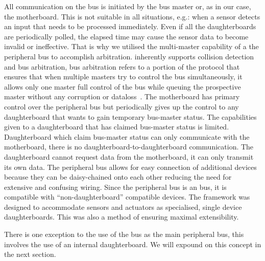 	All communication on the \iic bus is initiated by the bus master or, as in our case, the motherboard. This is not suitable in all situations, e.g.: when a sensor detects an input that needs to be processed immediately. Even if all the daughterboards are periodically polled, the elapsed time may cause the sensor data to become invalid or ineffective. That is why we utilised the multi-master capability of a the \iic peripheral bus to accomplish arbitration. \iic inherently supports collision detection and bus arbitration, bus arbitration refers to a portion of the protocol that ensures that when multiple masters try to control the bus simultaneously, it allows only one master full control of the bus while queuing the prospective master without any corruption or dataloss~\parencite{nxpi2c}. The motherboard has primary control over the peripheral bus but periodically gives up the control to any daughterboard that wants to gain temporary bus-master status. The capabilities given to a daughterboard that has claimed bus-master status is limited. Daughterboard which claim bus-master status can only communicate with the motherboard, there is no daughterboard-to-daughterboard communication. The daughterboard cannot request data from the motherboard, it can only transmit its own data.
	The peripheral bus allows for easy connection of additional devices because they can be daisy-chained onto each other reducing the need for extensive and confusing wiring. Since the peripheral bus is an \iic bus, it is compatible with ``non-daughterboard'' \iic compatible devices. The framework was designed to accommodate sensors and actuators as specialised, single device daughterboards. This was also a method of ensuring maximal extensibility.
	
	There is one exception to the use of the \iic bus as the main peripheral bus, this involves the use of an internal daughterboard. We will expound on this concept in the next section.
	
